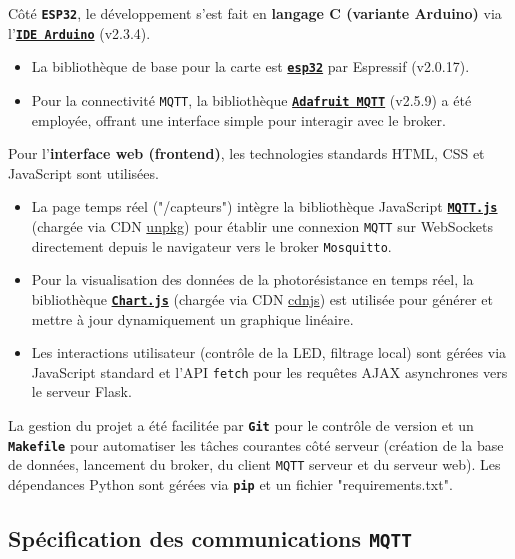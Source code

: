 \documentclass[12pt]{article}
\begin{document}
Côté \textbf{\texttt{ESP32}}, le développement s'est fait en \textbf{langage C (variante Arduino)} via l'\textbf{\href{https://www.arduino.cc/}{\texttt{IDE Arduino}}} (v2.3.4).
\begin{itemize}
    \item La bibliothèque de base pour la carte est \textbf{\href{https://github.com/espressif/arduino-esp32}{\texttt{esp32}}} par Espressif (v2.0.17).
    \item Pour la connectivité \texttt{MQTT}, la bibliothèque \textbf{\href{https://docs.arduino.cc/libraries/adafruit-mqtt-library/}{\texttt{Adafruit MQTT}}} (v2.5.9) a été employée, offrant une interface simple pour interagir avec le broker.
\end{itemize} \hfill \break

Pour l'\textbf{interface web (frontend)}, les technologies standards HTML, CSS et JavaScript sont utilisées.
\begin{itemize}
    \item La page temps réel ("/capteurs") intègre la bibliothèque JavaScript \textbf{\href{https://github.com/mqttjs/MQTT.js/}{\texttt{MQTT.js}}} (chargée via CDN \href{https://unpkg.com/}{unpkg}) pour établir une connexion \texttt{MQTT} sur WebSockets directement depuis le navigateur vers le broker \texttt{Mosquitto}.
    \item Pour la visualisation des données de la photorésistance en temps réel, la bibliothèque \textbf{\href{https://www.chartjs.org/}{\texttt{Chart.js}}} (chargée via CDN \href{https://cdnjs.com/}{cdnjs}) est utilisée pour générer et mettre à jour dynamiquement un graphique linéaire.
    \item Les interactions utilisateur (contrôle de la LED, filtrage local) sont gérées via JavaScript standard et l'API \texttt{fetch} pour les requêtes AJAX asynchrones vers le serveur Flask.
\end{itemize} \hfill \break

La gestion du projet a été facilitée par \textbf{\texttt{Git}} pour le contrôle de version et un \textbf{\texttt{Makefile}} pour automatiser les tâches courantes côté serveur (création de la base de données, lancement du broker, du client \texttt{MQTT} serveur et du serveur web). Les dépendances Python sont gérées via \textbf{\texttt{pip}} et un fichier "requirements.txt".

\subsection{Spécification des communications \texttt{MQTT}}
\end{document}
